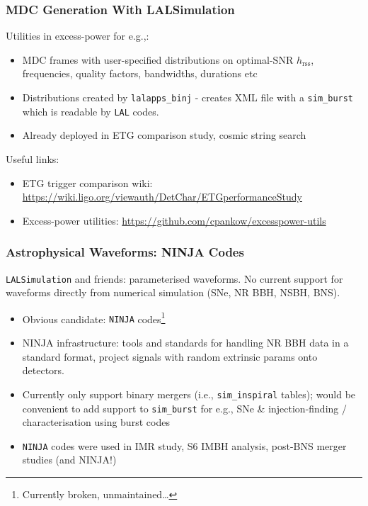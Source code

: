 \documentclass{beamer}
\begin{document}
\begin{frame}
    \frametitle{MDC Generation With LALSimulation}
    Utilities in excess-power for e.g.,:
    \begin{itemize}
        \item MDC frames with user-specified distributions on optimal-SNR
            $h_{\text{rss}}$, frequencies, quality factors, bandwidths,
            durations etc
        \item Distributions created by {\tt lalapps\_binj} - creates XML file
            with a {\tt sim\_burst} which is readable by {\tt LAL} codes.
        \item Already deployed in ETG comparison study, cosmic string search 
    \end{itemize}
    Useful links:
    \begin{itemize}
        \item ETG trigger comparison wiki:
            \href{https://wiki.ligo.org/viewauth/DetChar/ETGperformanceStudy}{https://wiki.ligo.org/viewauth/DetChar/ETGperformanceStudy}
        \item Excess-power utilities:
            \href{https://github.com/cpankow/excesspower-utils}{https://github.com/cpankow/excesspower-utils}
    \end{itemize}
\end{frame}

\begin{frame}
    \frametitle{Astrophysical Waveforms: NINJA Codes}
    {\tt LALSimulation} and friends: parameterised waveforms.  No current
    support for waveforms directly from numerical simulation (SNe, NR BBH, NSBH,
    BNS).
    \begin{itemize}
        \item Obvious candidate: {\tt NINJA} codes\footnote{Currently broken,
            unmaintained\dots}
        \item NINJA infrastructure: tools and standards for handling NR BBH data in a
            standard format, project signals with random extrinsic params onto
            detectors.
        \item Currently only support binary mergers (i.e., {\tt sim\_inspiral} tables);
            would be convenient to add support to {\tt sim\_burst} for e.g., SNe
            \& injection-finding / characterisation using burst codes
        \item {\tt NINJA} codes were used in IMR study, S6 IMBH analysis,
            post-BNS merger studies (and NINJA!)
    \end{itemize}
\end{frame}
\end{document}
